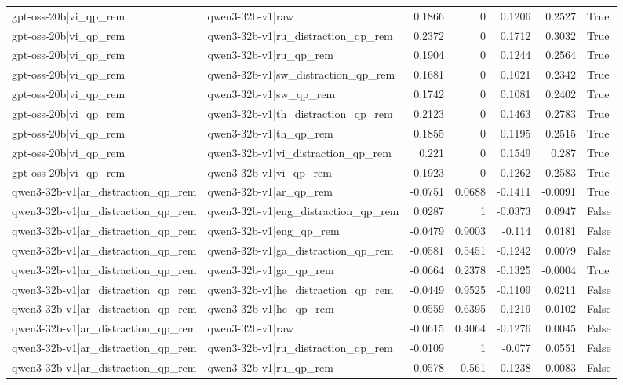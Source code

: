 \begin{table}
\begin{tabular}{l l r r r r l}
gpt-oss-20b|vi_qp_rem & qwen3-32b-v1|raw & 0.1866 & 0 & 0.1206 & 0.2527 & True \\
gpt-oss-20b|vi_qp_rem & qwen3-32b-v1|ru_distraction_qp_rem & 0.2372 & 0 & 0.1712 & 0.3032 & True \\
gpt-oss-20b|vi_qp_rem & qwen3-32b-v1|ru_qp_rem & 0.1904 & 0 & 0.1244 & 0.2564 & True \\
gpt-oss-20b|vi_qp_rem & qwen3-32b-v1|sw_distraction_qp_rem & 0.1681 & 0 & 0.1021 & 0.2342 & True \\
gpt-oss-20b|vi_qp_rem & qwen3-32b-v1|sw_qp_rem & 0.1742 & 0 & 0.1081 & 0.2402 & True \\
gpt-oss-20b|vi_qp_rem & qwen3-32b-v1|th_distraction_qp_rem & 0.2123 & 0 & 0.1463 & 0.2783 & True \\
gpt-oss-20b|vi_qp_rem & qwen3-32b-v1|th_qp_rem & 0.1855 & 0 & 0.1195 & 0.2515 & True \\
gpt-oss-20b|vi_qp_rem & qwen3-32b-v1|vi_distraction_qp_rem & 0.221 & 0 & 0.1549 & 0.287 & True \\
gpt-oss-20b|vi_qp_rem & qwen3-32b-v1|vi_qp_rem & 0.1923 & 0 & 0.1262 & 0.2583 & True \\
qwen3-32b-v1|ar_distraction_qp_rem & qwen3-32b-v1|ar_qp_rem & -0.0751 & 0.0688 & -0.1411 & -0.0091 & True \\
qwen3-32b-v1|ar_distraction_qp_rem & qwen3-32b-v1|eng_distraction_qp_rem & 0.0287 & 1 & -0.0373 & 0.0947 & False \\
qwen3-32b-v1|ar_distraction_qp_rem & qwen3-32b-v1|eng_qp_rem & -0.0479 & 0.9003 & -0.114 & 0.0181 & False \\
qwen3-32b-v1|ar_distraction_qp_rem & qwen3-32b-v1|ga_distraction_qp_rem & -0.0581 & 0.5451 & -0.1242 & 0.0079 & False \\
qwen3-32b-v1|ar_distraction_qp_rem & qwen3-32b-v1|ga_qp_rem & -0.0664 & 0.2378 & -0.1325 & -0.0004 & True \\
qwen3-32b-v1|ar_distraction_qp_rem & qwen3-32b-v1|he_distraction_qp_rem & -0.0449 & 0.9525 & -0.1109 & 0.0211 & False \\
qwen3-32b-v1|ar_distraction_qp_rem & qwen3-32b-v1|he_qp_rem & -0.0559 & 0.6395 & -0.1219 & 0.0102 & False \\
qwen3-32b-v1|ar_distraction_qp_rem & qwen3-32b-v1|raw & -0.0615 & 0.4064 & -0.1276 & 0.0045 & False \\
qwen3-32b-v1|ar_distraction_qp_rem & qwen3-32b-v1|ru_distraction_qp_rem & -0.0109 & 1 & -0.077 & 0.0551 & False \\
qwen3-32b-v1|ar_distraction_qp_rem & qwen3-32b-v1|ru_qp_rem & -0.0578 & 0.561 & -0.1238 & 0.0083 & False \\

\end{tabular}
\end{table}

